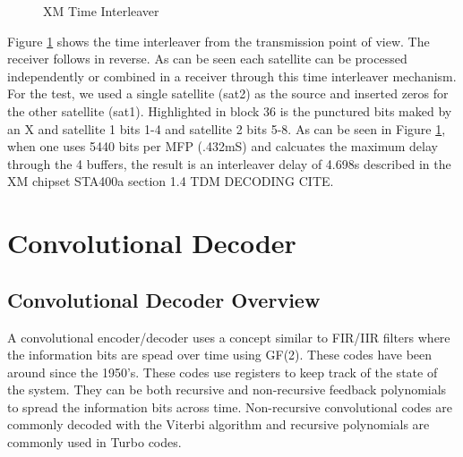 \documentclass[conference,onecolumn]{IEEEtran}
\begin{document}
\begin{figure}[H]
	\centerline{}
	\caption{XM Time Interleaver}
	\label{fig::time_interleaver}
\end{figure}
Figure \ref{fig::time_interleaver} shows the time interleaver from the transmission point of view.  The receiver follows in reverse. As can be seen each satellite can be processed independently or combined in a receiver through this time interleaver mechanism.  For the test, we used a single satellite (sat2) as the source and inserted zeros for the other satellite (sat1). Highlighted in block 36 is the punctured bits maked by an X and satellite 1 bits 1-4 and satellite 2 bits 5-8.  As can be seen in Figure \ref{fig::time_interleaver}, when one uses 5440 bits per MFP (.432mS) and calcuates the maximum delay through the 4 buffers, the result is an interleaver delay of 4.698s described in the XM chipset STA400a section 1.4 TDM DECODING {CITE}.

\section{Convolutional Decoder}
\subsection{Convolutional Decoder Overview}
A convolutional encoder/decoder uses a concept similar to FIR/IIR filters where the information bits are spead over time using GF(2).  These codes have been around since the 1950's.  These codes use registers to keep track of the state of the system.  They can be both recursive and non-recursive feedback polynomials to spread the information bits across time.  Non-recursive convolutional codes are commonly decoded with the Viterbi algorithm and recursive polynomials are commonly used in Turbo codes.
\end{document}
